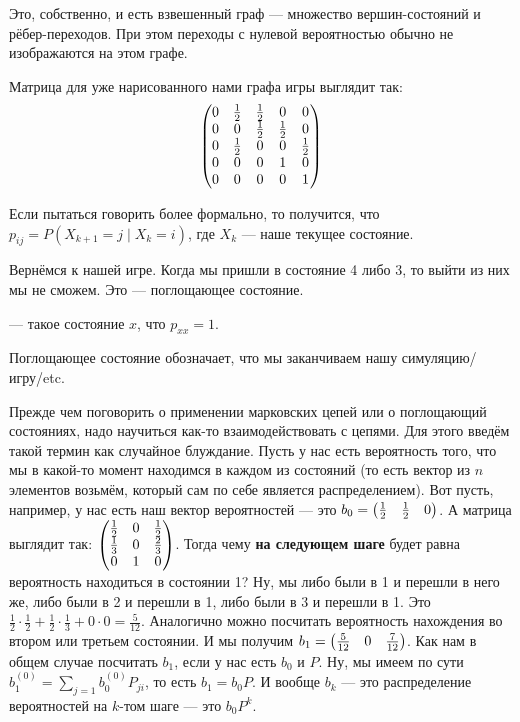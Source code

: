\documentclass{article}
\begin{document}
\begin{itemize}
        \begin{Comment}
            Это, собственно, и есть взвешенный граф --- множество вершин-состояний и рёбер-переходов. При этом переходы с нулевой вероятностью обычно не изображаются на этом графе.
        \end{Comment}
        \begin{Example}
            Матрица для уже нарисованного нами графа игры выглядит так:
            $$
            \left(\begin{matrix}
                0 & \frac12 & \frac12 & 0 & 0\\
                0 & 0 & \frac12 & \frac12 & 0\\
                0 & \frac12 & 0 & 0 & \frac12\\
                0 & 0 & 0 & 1 & 0\\
                0 & 0 & 0 & 0 & 1
            \end{matrix}\right)
            $$
        \end{Example}
        \begin{Comment}
            Если пытаться говорить более формально, то получится, что $p_{ij}=P(X_{k+1}=j\mid X_k=i)$, где $X_k$ --- наше текущее состояние.
        \end{Comment}
        \begin{Comment}
            Вернёмся к нашей игре. Когда мы пришли в состояние 4 либо 3, то выйти из них мы не сможем. Это --- поглощающее состояние.
        \end{Comment}
        \dfn {} --- такое состояние $x$, что $p_{xx}=1$.
        \begin{Comment}
            Поглощающее состояние обозначает, что мы заканчиваем нашу симуляцию/игру/etc.
        \end{Comment}
        \begin{Comment}
            Прежде чем поговорить о применении марковских цепей или о поглощающий состояниях, надо научиться как-то взаимодействовать с цепями. Для этого введём такой термин как случайное блуждание. Пусть у нас есть вероятность того, что мы в какой-то момент находимся в каждом из состояний (то есть вектор из $n$ элементов возьмём, который сам по себе является распределением). Вот пусть, например, у нас есть наш вектор вероятностей --- это $b_0=\left(\begin{matrix}\frac12 & \frac12 & 0\end{matrix}\right)$. А матрица выглядит так: $\left(\begin{matrix}\frac12 & 0 & \frac12\\\frac13 & 0 & \frac23\\0 & 1 & 0\end{matrix}\right)$. Тогда чему \textbf{на следующем шаге} будет равна вероятность находиться в состоянии 1? Ну, мы либо были в 1 и перешли в него же, либо были в 2 и перешли в 1, либо были в 3 и перешли в 1. Это $\frac12\cdot\frac12+\frac12\cdot\frac13+0\cdot0=\frac5{12}$. Аналогично можно посчитать вероятность нахождения во втором или третьем состоянии. И мы получим $b_1=\left(\begin{matrix}\frac5{12} & 0 & \frac7{12}\end{matrix}\right)$. Как нам в общем случае посчитать $b_1$, если у нас есть $b_0$ и $P$. Ну, мы имеем по сути $b_1^{(0)}=\sum\limits_{j=1}b^{(0)}_0P_{ji}$, то есть $b_1=b_0P$. И вообще $b_k$ --- это распределение вероятностей на $k$-том шаге --- это $b_0P^k$.

\end{Comment}
\end{itemize}
\end{document}
